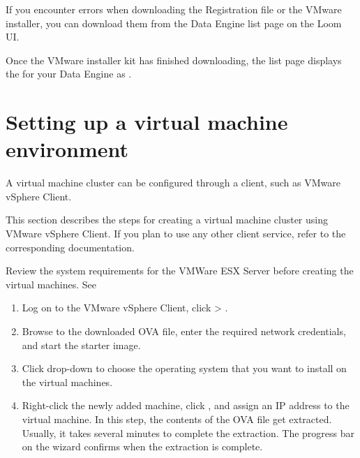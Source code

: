 \documentclass[letterpaper,10pt,english]{sphinxmanual}
\begin{document}
If you encounter errors when downloading the Registration file or the VMware installer, you can download them from the Data Engine list page on the Loom UI.

Once the VMware installer kit has finished downloading, the  list page displays the  for your Data Engine as .


\chapter{Setting up a virtual machine environment}
\label{\detokenize{on_prem_dp_install_mcdmp:setting-up-a-virtual-machine-environment}}\label{\detokenize{on_prem_dp_install_mcdmp:set-up-vm-env}}
A virtual machine cluster can be configured through a client, such as VMware vSphere Client.

This section describes the steps for creating a virtual machine cluster using VMware vSphere Client. If you plan to use any other client service, refer to the
corresponding documentation.

Review the system requirements for the VMWare ESX Server before creating the virtual machines. See {\hyperref[\detokenize{on_prem_dp_install_mcdmp:sys-req}]{}}

\begin{enumerate}
\item {} 
Log on to the VMware vSphere Client, click  \textgreater{} .

\item {} 
Browse to the downloaded OVA file, enter the required network credentials, and start the starter image.

\item {} 
Click  drop-down to choose the operating system that you want to install on the virtual machines.

\item {} 
Right-click the newly added machine, click , and assign an IP address to the virtual machine.
In this step, the contents of the OVA file get extracted. Usually, it takes several minutes to complete the extraction. The progress bar on the wizard confirms when the extraction is complete.

\end{enumerate}
\end{document}
